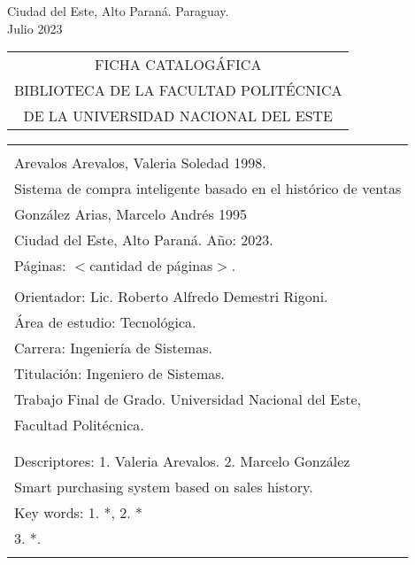 \begin{center}
{\large Ciudad del Este, Alto Paraná. Paraguay.\\[6mm]
Julio 2023}
\end{center}
\newpage \normalsize
\thispagestyle{empty}
\begin{center} 
\begin{tabular}{c} 
  FICHA CATALOGÁFICA \\
  BIBLIOTECA DE LA FACULTAD POLITÉCNICA \\
  DE LA UNIVERSIDAD NACIONAL DEL ESTE \\
\end{tabular} %
\vspace{0.3cm}
\begin{tabular}{|l|} \hline %
  \\
  Arevalos Arevalos, Valeria Soledad 1998.\\
   Sistema de compra inteligente basado en el histórico de ventas  \\
  González Arias, Marcelo Andrés 1995\\
  Ciudad del Este, Alto Paraná. Año: 2023.\\
  Páginas: $<$cantidad de páginas$>$.\\ 
  \\
  Orientador: Lic. Roberto Alfredo Demestri Rigoni. \\
  
  Área de estudio: Tecnológica. \\
  Carrera: Ingeniería de Sistemas. \\
  Titulación: Ingeniero de Sistemas. \\
  
  Trabajo Final de Grado. Universidad Nacional del Este, \\
  Facultad Politécnica.\\
  \\ \\
  
  Descriptores: 1. Valeria Arevalos. 2. Marcelo González\\
  Smart purchasing system based on sales history. \\
  Key words: 1. *, 2. * \\
  \hspace{2cm} 3. *.\\
  \\
  \hline

\end{tabular}
\end{center}


